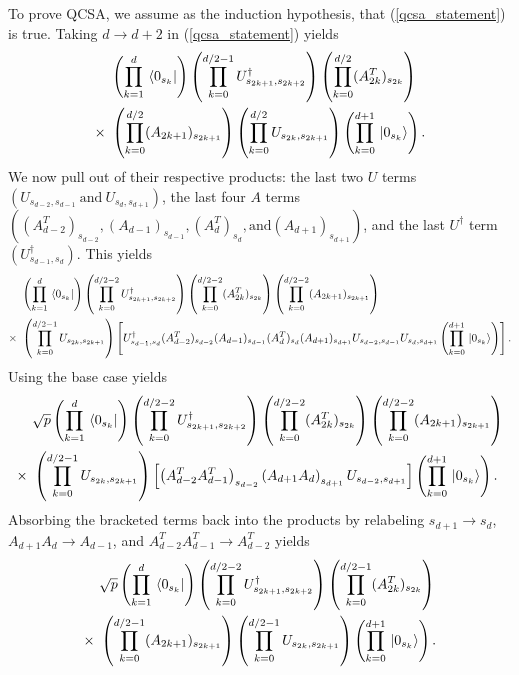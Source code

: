 \documentclass[Dual]{msu-thesis}
\begin{document}
To prove QCSA, we assume as the induction hypothesis, that (\ref{qcsa_statement}) is true. Taking $d\to d+2$ in (\ref{qcsa_statement}) yields
\begin{align}
&
\left(\prod_{k=1}^{d}\bra*{0_{s_k}}\right)
\left(\prod_{k=0}^{d/2-1}U^\dagger_{s_{2k+1},s_{2k+2}}\right)
\left(\prod_{k=0}^{d/2}(A^T_{2k})_{s_{2k}}\right)
\nonumber
\\
\times \ &
\left(\prod_{k=0}^{d/2}(A_{2k+1})_{s_{2k+1}}\right)
\left(\prod_{k=0}^{d/2}U_{s_{2k},s_{2k+1}}\right)
\left(\prod_{k=0}^{d+1}\ket*{0_{s_k}}\right).
\end{align}
We now pull out of their respective products: the last two $U$ terms $\left(U_{s_{d-2},s_{d-1}} \ \text{and} \ U_{s_{d},s_{d+1}}\right)$, the last four $A$ terms $\left((A^T_{d-2})_{s_{d-2}},(A_{d-1})_{s_{d-1}},(A^T_{d})_{s_{d}}, \text{and} (A_{d+1})_{s_{d+1}}\right)$, and the last $U^\dagger$ term $\left(U^\dagger_{s_{d-1},s_d}\right)$. This yields
\begin{align}
&
\left(\prod_{k=1}^{d}\bra*{0_{s_k}}\right)
\left(\prod_{k=0}^{d/2-2}U^\dagger_{s_{2k+1},s_{2k+2}}\right)
\left(\prod_{k=0}^{d/2-2}(A^T_{2k})_{s_{2k}}\right)
\left(\prod_{k=0}^{d/2-2}(A_{2k+1})_{s_{2k+1}}\right)
\nonumber
\\
\times \ &
\left(\prod_{k=0}^{d/2-1}U_{s_{2k},s_{2k+1}}\right)
\left[
U^\dagger_{s_{d-1},s_{d}}
(A^T_{d-2})_{s_{d-2}}(A_{d-1})_{s_{d-1}}(A^T_{d})_{s_{d}}(A_{d+1})_{s_{d+1}}
U_{s_{d-2},s_{d-1}}U_{s_{d},s_{d+1}}
\left(\prod_{k=0}^{d+1}\ket*{0_{s_k}}\right)\right].
\end{align}
Using the base case yields
\begin{align}
&\sqrt{p}
\left(\prod_{k=1}^{d}\bra*{0_{s_k}}\right)
\left(\prod_{k=0}^{d/2-2}U^\dagger_{s_{2k+1},s_{2k+2}}\right)
\left(\prod_{k=0}^{d/2-2}(A^T_{2k})_{s_{2k}}\right)
\left(\prod_{k=0}^{d/2-2}(A_{2k+1})_{s_{2k+1}}\right)
\nonumber
\\
\times \ &
\left(\prod_{k=0}^{d/2-1}U_{s_{2k},s_{2k+1}}\right)
\left[
\left(A^T_{d-2}A^T_{d-1}\right)_{s_{d-2}}
\left(A_{d+1}A_d\right)_{s_{d+1}}
U_{s_{d-2},s_{d+1}}\right]
\left(\prod_{k=0}^{d+1}\ket*{0_{s_k}}\right).
\end{align}
Absorbing the bracketed terms back into the products by relabeling $s_{d+1}\to s_d$, $A_{d+1}A_d\to A_{d-1}$, and $A^T_{d-2}A^T_{d-1}\to A^T_{d-2}$ yields
\begin{align}
&\sqrt{p}
\left(\prod_{k=1}^{d}\bra*{0_{s_k}}\right)
\left(\prod_{k=0}^{d/2-2}U^\dagger_{s_{2k+1},s_{2k+2}}\right)
\left(\prod_{k=0}^{d/2-1}(A^T_{2k})_{s_{2k}}\right)
\nonumber
\\
\times \ &
\left(\prod_{k=0}^{d/2-1}(A_{2k+1})_{s_{2k+1}}\right)
\left(\prod_{k=0}^{d/2-1}U_{s_{2k},s_{2k+1}}\right)
\left(\prod_{k=0}^{d+1}\ket*{0_{s_k}}\right).
\end{align}
\end{document}
